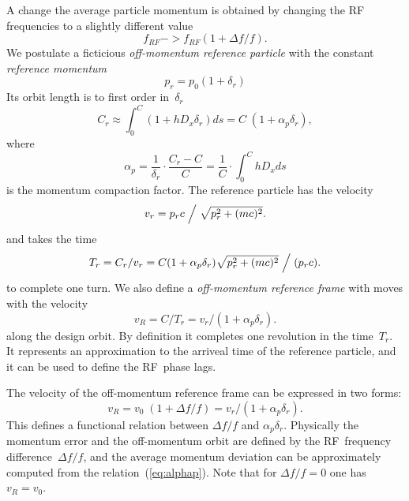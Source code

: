 \documentclass{report}
\begin{document}
A change the average particle momentum is obtained by changing the RF
frequencies to a slightly different value
\begin{equation}
f_{RF} -> f_{RF} (1 + \Delta f/f).
\end{equation}
We postulate a ficticious \textit{off-momentum reference particle}
with the constant \textit{reference momentum}
\begin{equation}
  p_r = p_0 (1 + \delta_r)
\end{equation}
Its orbit length is to first order in~$\delta_r$
\begin{equation}
  C_r \approx \int_0^C (1 + h D_x \delta_r) ds = C\;(1 + \alpha_p\delta_r),
\end{equation}
where
\begin{equation}
  \alpha_p = \frac{1}{\delta_r} \cdot \frac{C_r - C}{C} =
  \frac{1}{C} \cdot \int_0^C h D_x ds
\end{equation}
is the momentum compaction factor.
The reference particle has the velocity
\begin{equation}
  v_r = p_r c \Bigm/ \sqrt{p_r^2+(mc)^2}.
\end{equation}
and takes the time
\begin{equation}
  T_r = C_r / v_r = 
  C (1+\alpha_p \delta_r) \sqrt{p_r^2+(mc)^2} \Bigm/ (p_r c).
\end{equation}
to complete one turn.
We also define a \textit{off-momentum reference frame} with moves with
the velocity 
\begin{equation}
  v_R = C / T_r = v_r / (1 + \alpha_p\delta_r).
\end{equation}
along the design orbit.
By definition it completes one revolution in the time~$T_r$.
It represents an approximation to the arriveal time of the reference
particle, and it can be used to define the RF~phase lags.

The velocity of the off-momentum reference frame can be expressed in
two forms: 
\begin{equation}
  v_R = v_0\;(1+\Delta f/f) = v_r / (1+\alpha_p \delta_r).
  \label{eq:alphap}
\end{equation}
This defines a functional relation between $\Delta f/f$ and
$\alpha_p\delta_r$.
Physically the momentum error and the off-momentum orbit are defined
by the RF~frequency difference~$\Delta f/f$,
and the average momentum deviation can be approximately computed from
the relation~(\ref{eq:alphap}).
Note that for $\Delta f/f = 0$ one has $v_R = v_0$.

\clearpage
\end{document}
